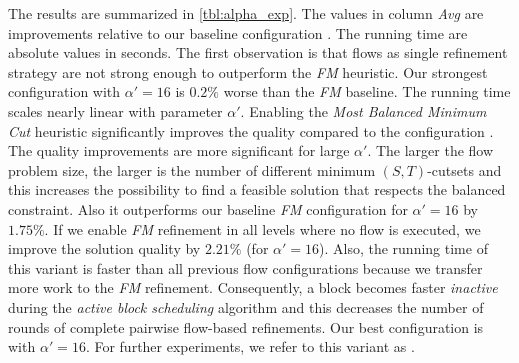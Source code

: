 The results are summarized in \autoref{tbl:alpha_exp}. The values
in column \emph{Avg} are improvements
relative to our baseline configuration \FlowVariant{-}{-}{+}. The running
time are absolute values in seconds. The first observation is that flows
as single refinement strategy are not strong enough to outperform the
\emph{FM} heuristic. Our strongest configuration with $\alpha' = 16$
is $0.2\%$ worse than the \emph{FM} baseline. The running time
scales nearly linear with parameter $\alpha'$. 
Enabling the \emph{Most Balanced Minimum Cut} heuristic significantly improves the
quality compared to the configuration \FlowVariant{+}{-}{-}.
The quality improvements are more significant for large
$\alpha'$. The larger the flow problem size, the larger is the number of different minimum 
$(S,T)$-cutsets and this increases the possibility to find a feasible solution that respects the 
balanced constraint. Also it outperforms our baseline \emph{FM} 
configuration for $\alpha' = 16$ by $1.75\%$.
If we enable \emph{FM} refinement in all levels where no flow is executed, we improve the solution
quality by $2.21\%$ (for $\alpha' = 16$). Also, the running time of this variant is faster
than all previous flow configurations because we transfer more work to the \emph{FM} refinement.
Consequently, a block becomes faster \emph{inactive} during the \emph{active block 
scheduling} algorithm and this decreases the number of rounds of complete pairwise 
flow-based refinements. 
Our best configuration is \FlowVariant{+}{+}{+} with $\alpha' = 16$. 
For further experiments, we refer to this variant as .

